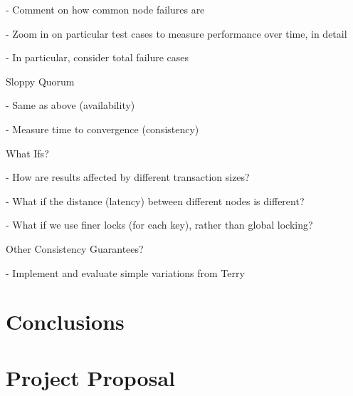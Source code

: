 \documentclass[12pt,a4paper,twoside,openright]{report}
\begin{document}
- Comment on how common node failures are \cite{45855}

- Zoom in on particular test cases to measure performance over time, in detail

- In particular, consider total failure cases

Sloppy Quorum

- Same as above (availability)

- Measure time to convergence (consistency)

What Ifs?

- How are results affected by different transaction sizes?

- What if the distance (latency) between different nodes is different?

- What if we use finer locks (for each key), rather than global locking?

Other Consistency Guarantees?

- Implement and evaluate simple variations from Terry \cite{terry2013}

\chapter{Conclusions}



\appendix
%
%
%
%
%
%

\chapter{Project Proposal}


\end{document}
